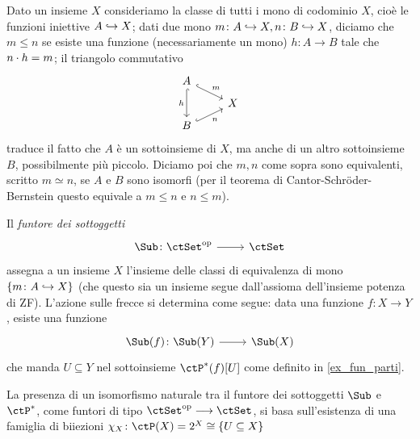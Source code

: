 \begin{definition}\label{def_fun_sub_onset}
 Dato un insieme \(X\) consideriamo la classe di tutti i mono di codominio \(X\), cioè le funzioni iniettive \(A\hookrightarrow X\); dati due mono \(m \colon A\hookrightarrow X, n \colon B\hookrightarrow X\), diciamo che \(m\le n\) se esiste una funzione (necessariamente un mono) \(h \colon A\to B\) tale che \(n\cdot h = m\); il triangolo commutativo
 \[\begin{tikzcd}[row sep=2mm]
   A \\
   & X \\
   B
   \arrow["m", hook, from=1-1, to=2-2]
   \arrow["h"', hook, from=1-1, to=3-1]
   \arrow["n"', hook, from=3-1, to=2-2]
  \end{tikzcd}\]
 traduce il fatto che \(A\) è un sottoinsieme di \(X\), ma anche di un altro sottoinsieme \(B\), possibilmente più piccolo. Diciamo poi che \(m,n\) come sopra sono equivalenti, scritto \(m\simeq n\), se \(A\) e \(B\) sono isomorfi (per il teorema di Cantor-Schröder-Bernstein questo equivale a \(m\le n\) e \(n\le m\)).

 Il \emph{funtore dei sottoggetti}
 \[\dmFun{\Sub}{\ctSet^\op}{\ctSet}\]
 assegna a un insieme \(X\) l'insieme delle classi di equivalenza di mono \(\{m \colon A\hookrightarrow X\}\) (che questo sia un insieme segue dall'assioma dell'insieme potenza di ZF). L'azione sulle frecce si determina come segue: data una funzione \(f \colon X\to Y\), esiste una funzione
 \[\dmFun{\Sub(f)}{\Sub(Y)}{\Sub(X)}\]
 che manda \(U\subseteq Y\) nel sottoinsieme \(\ctP^*(f)[U]\) come definito in \ref{ex_fun_parti}.

 La presenza di un isomorfismo naturale tra il funtore dei sottoggetti \(\Sub\) e \(\ctP^*\), come funtori di tipo \(\ctSet^\op\fun\ctSet\), si basa sull'esistenza di una famiglia di biiezioni \(\chi_X \colon \ctP(X) = \pow X \cong \{U\subseteq X\}\)
\end{definition}
